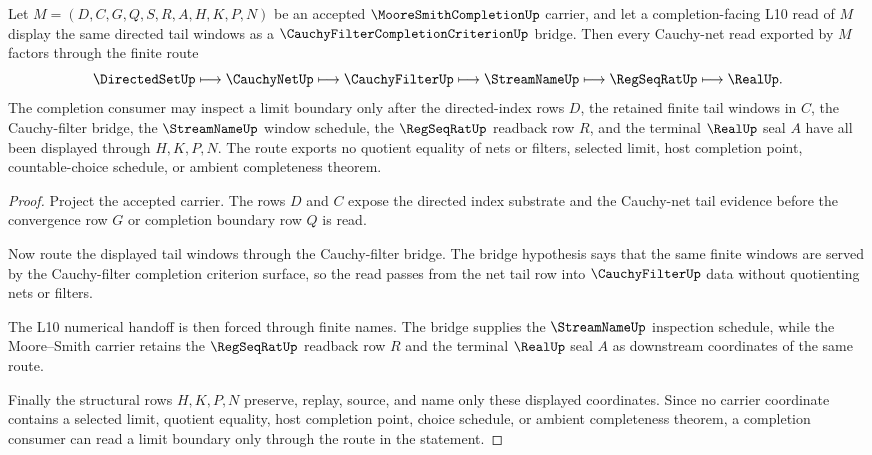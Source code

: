 \begin{theorem}
\label{thm:moore-smith-net-filter-completion-route}
Let $M=(D,C,G,Q,S,R,A,H,K,P,N)$ be an accepted $\MooreSmithCompletionUp$ carrier, and let a completion-facing L10 read of $M$ display the same directed tail windows as a $\CauchyFilterCompletionCriterionUp$ bridge. Then every Cauchy-net read exported by $M$ factors through the finite route
$$
\DirectedSetUp \longmapsto \CauchyNetUp \longmapsto \CauchyFilterUp \longmapsto \StreamNameUp \longmapsto \RegSeqRatUp \longmapsto \RealUp .
$$
The completion consumer may inspect a limit boundary only after the directed-index rows $D$, the retained finite tail windows in $C$, the Cauchy-filter bridge, the $\StreamNameUp$ window schedule, the $\RegSeqRatUp$ readback row $R$, and the terminal $\RealUp$ seal $A$ have all been displayed through $H,K,P,N$. The route exports no quotient equality of nets or filters, selected limit, host completion point, countable-choice schedule, or ambient completeness theorem.
\end{theorem}
\begin{proof}
Project the accepted carrier. The rows $D$ and $C$ expose the directed index substrate and the Cauchy-net tail evidence before the convergence row $G$ or completion boundary row $Q$ is read.

Now route the displayed tail windows through the Cauchy-filter bridge. The bridge hypothesis says that the same finite windows are served by the Cauchy-filter completion criterion surface, so the read passes from the net tail row into $\CauchyFilterUp$ data without quotienting nets or filters.

The L10 numerical handoff is then forced through finite names. The bridge supplies the $\StreamNameUp$ inspection schedule, while the Moore--Smith carrier retains the $\RegSeqRatUp$ readback row $R$ and the terminal $\RealUp$ seal $A$ as downstream coordinates of the same route.

Finally the structural rows $H,K,P,N$ preserve, replay, source, and name only these displayed coordinates. Since no carrier coordinate contains a selected limit, quotient equality, host completion point, choice schedule, or ambient completeness theorem, a completion consumer can read a limit boundary only through the route in the statement.
\end{proof}

